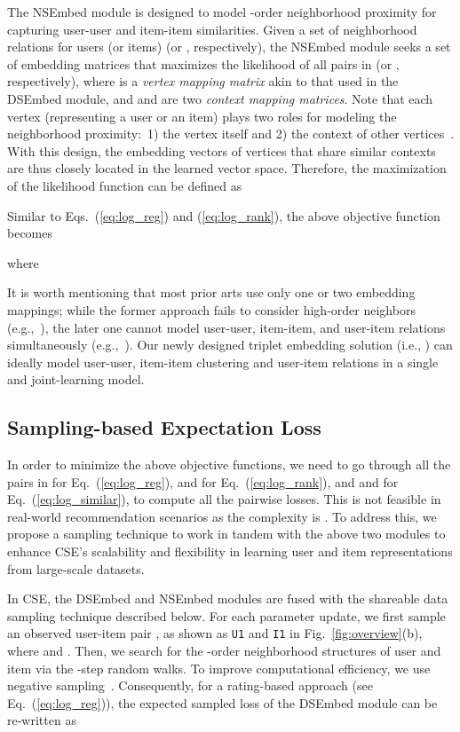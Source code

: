 \documentclass[sigconf,anonymous=false]{acmart}
\begin{document}
The NSEmbed module is designed to model -order neighborhood proximity for
capturing user-user and item-item similarities.
Given a set of neighborhood relations for users (or items)  (or , respectively), the NSEmbed module seeks a set of
    embedding matrices 
    that maximizes the likelihood of all pairs in  (or ,
    respectively), where  is a \emph{vertex mapping matrix} akin to that
    used in the DSEmbed module, and  and  are two
    \emph{context mapping matrices}.
Note that each vertex (representing a user or an item) plays two roles for
modeling the neighborhood proximity:~1) the vertex itself and 2) the
context of other vertices~\cite{dw,line,n2v,app,hpe}.
With this design, the embedding vectors of vertices that share similar contexts
are thus closely located in the learned vector space.
Therefore, the maximization of the likelihood function can be defined as


Similar to Eqs.~(\ref{eq:log_reg}) and (\ref{eq:log_rank}), the above
objective function becomes

where



It is worth mentioning that most prior arts use only one or two embedding
mappings; while the former approach fails to consider high-order 
neighbors (e.g.,~\cite{line,libmf,mf,cdl,trustsvd}), 
the later one cannot model user-user, item-item, and user-item relations
simultaneously (e.g.,~\cite{dw,wl,hpe,n2v,app,i2v}).
Our newly designed triplet embedding solution (i.e., ) can ideally model user-user, item-item clustering and user-item
relations in a single and joint-learning model.



\subsection{Sampling-based Expectation Loss}
\label{sec:sample}

In order to minimize the above objective functions, we need to go through
all the pairs in  for Eq.~(\ref{eq:log_reg}),  and  for
Eq.~(\ref{eq:log_rank}), and  and  for Eq.~(\ref{eq:log_similar}),
to compute all the pairwise losses. This is not feasible in real-world
recommendation scenarios as the complexity is . 
To address this, we propose a sampling technique to work in tandem with the above
two modules to enhance CSE's scalability and flexibility in learning user and
item representations from large-scale datasets.

In CSE, the DSEmbed and NSEmbed modules are fused with the shareable
data sampling technique described below.
For each parameter update, we first sample an observed user-item 
pair , as shown as \texttt{U1} and \texttt{I1} in
Fig.~\ref{fig:overview}(b), where  and .
Then, we search for the -order neighborhood structures of user  and
item  via the -step random walks.
To improve computational efficiency, we use negative sampling~\cite{line}.
Consequently, for a rating-based approach (see Eq.~(\ref{eq:log_reg})),
the expected sampled loss of the DSEmbed module can be re-written as
\end{document}
